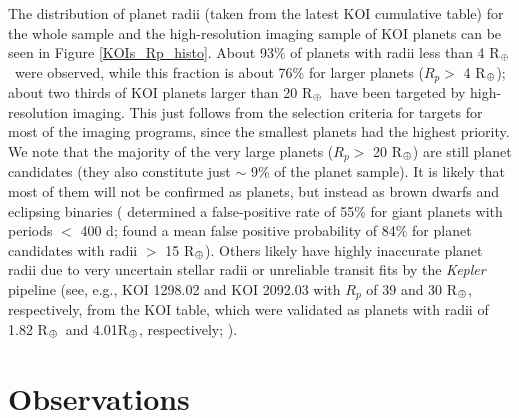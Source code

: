 \documentclass[twocolumn,appendixfloats]{aastex6}
\newcommand{\RE}{R$_{\Earth}$}
\begin{document}
The distribution of planet radii (taken from the latest KOI cumulative table) 
for the whole sample and the high-resolution imaging sample of KOI planets 
can be seen in Figure \ref{KOIs_Rp_histo}. 
About 93\% of planets with radii less than 4 \RE\ were observed, while this 
fraction is about 76\% for larger planets ($R_p > $ 4 \RE); about two thirds
of KOI planets larger than 20 \RE\ have been targeted by high-resolution 
imaging. This just follows from the selection criteria for targets for most of 
the imaging programs, since the smallest planets had the highest priority.
We note that the majority of the very large planets ($R_p > $ 20 \RE) are 
still planet candidates (they also constitute just $\sim$ 9\% of the planet 
sample). It is likely that most of them will not be confirmed as planets,
but instead as brown dwarfs and eclipsing binaries (\citealt{santerne16} 
determined a false-positive rate of 55\% for giant planets with periods 
$<$ 400 d; \citealt{morton16} found a mean false positive probability of
84\% for planet candidates with radii $>$ 15 \RE). Others likely have 
highly inaccurate planet radii due to very uncertain stellar radii or 
unreliable transit fits by the {\it Kepler} pipeline (see, e.g., KOI 1298.02 
and KOI 2092.03 with $R_p$ of 39 and 30 \RE, respectively, from the 
KOI table, which were validated as planets with radii of 1.82 \RE\ and 
4.01\RE, respectively; \citealt{rowe14}). 


\section{Observations}
\label{imaging}
\end{document}
